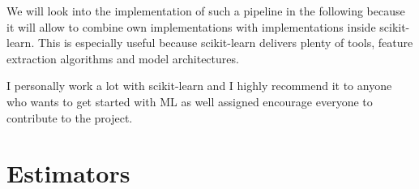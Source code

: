 We will look into the implementation of such a pipeline in the following because it will allow to combine
own implementations with implementations inside scikit-learn. This is especially useful because scikit-learn
delivers plenty of tools, feature extraction algorithms and model architectures.

I personally work a lot with scikit-learn and I highly recommend it to anyone who wants to get started with ML as well assigned
encourage everyone to contribute to the project.

\section{Estimators}
\framedtext{\color{red}{TODO:}}

